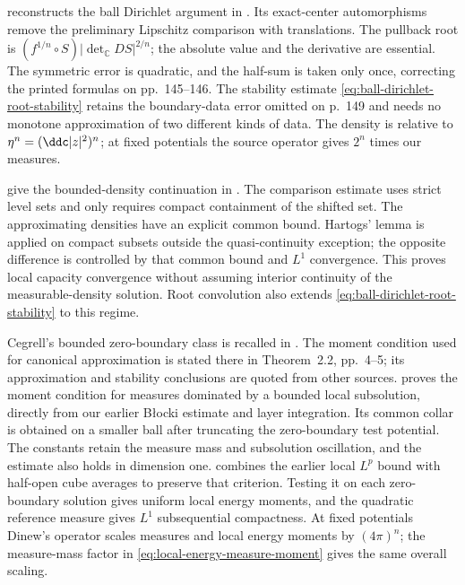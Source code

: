  reconstructs the ball Dirichlet argument in \cite[Theorems 5.13--5.14 and Corollary 5.15, pp.~143--149]{GZ17}. Its exact-center automorphisms remove the preliminary Lipschitz comparison with translations. The pullback root is $(f^{1/n}\circ S)|\det_{\mathbb C}DS|^{2/n}$; the absolute value and the derivative are essential. The symmetric error is quadratic, and the half-sum is taken only once, correcting the printed formulas on pp.~145--146. The stability estimate \eqref{eq:ball-dirichlet-root-stability} retains the boundary-data error omitted on p.~149 and needs no monotone approximation of two different kinds of data. The density is relative to $\eta^n=(\ddc|z|^2)^n$; at fixed potentials the source operator gives $2^n$ times our measures.

 give the bounded-density continuation in \cite[Theorem 5.17 and Lemma 5.18, pp.~150--151]{GZ17}. The comparison estimate uses strict level sets and only requires compact containment of the shifted set. The approximating densities have an explicit common bound. Hartogs\textquoteright{} lemma is applied on compact subsets outside the quasi-continuity exception; the opposite difference is controlled by that common bound and $L^1$ convergence. This proves local capacity convergence without assuming interior continuity of the measurable-density solution. Root convolution also extends \eqref{eq:ball-dirichlet-root-stability} to this regime.

Cegrell's bounded zero-boundary class is recalled in \cite[Section 2, p.~3]{Din07MixedV1}. The moment condition used for canonical approximation is stated there in Theorem~2.2, pp.~4--5; its approximation and stability conclusions are quoted from other sources.  proves the moment condition for measures dominated by a bounded local subsolution, directly from our earlier B\l{}ocki estimate and layer integration. Its common collar is obtained on a smaller ball after truncating the zero-boundary test potential. The constants retain the measure mass and subsolution oscillation, and the estimate also holds in dimension one.  combines the earlier local $L^p$ bound with half-open cube averages to preserve that criterion. Testing it on each zero-boundary solution gives uniform local energy moments, and the quadratic reference measure gives $L^1$ subsequential compactness. At fixed potentials Dinew's operator scales measures and local energy moments by $(4\pi)^n$; the measure-mass factor in \eqref{eq:local-energy-measure-moment} gives the same overall scaling.

